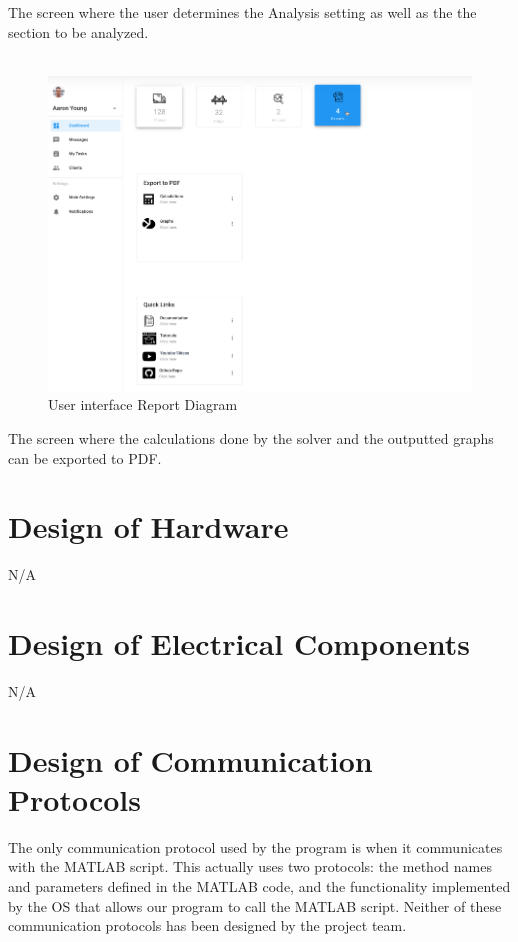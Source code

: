 \documentclass[12pt, titlepage]{article}
\begin{document}
The screen where the user determines the Analysis setting as well as the the section to be analyzed.\\\\
\begin{figure}[H]
  \centering
  \includegraphics[]{../images/Userinterface-Report.PNG}
  \caption{User interface Report Diagram}
  \label{fig:userinterface-report-diagram}
\end{figure}
The screen where the calculations done by the solver and the outputted graphs can be exported to PDF.

\section{Design of Hardware}
N/A

\section{Design of Electrical Components}
N/A

\section{Design of Communication Protocols}

The only communication protocol used by the program is when it communicates with the MATLAB script. This actually uses two protocols: the method names and parameters defined in the MATLAB code, and the functionality implemented by the OS that allows our program to call the MATLAB script. Neither of these communication protocols has been designed by the project team.
\end{document}
